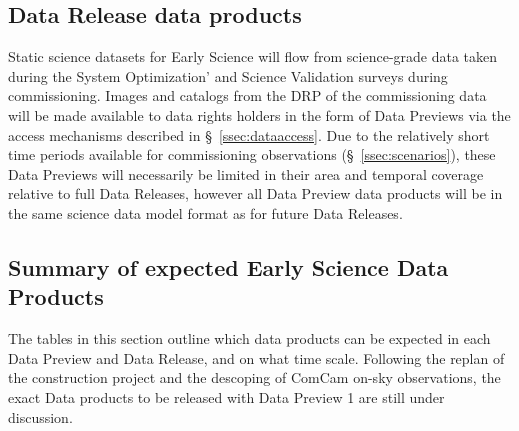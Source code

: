 %
%
%

\subsection{Data Release data products}

Static science datasets for Early Science will flow from science-grade data taken during the System Optimization' and Science Validation surveys during commissioning.
Images and catalogs from the DRP of the commissioning data will be made available to data rights holders in the form of Data Previews via the access mechanisms described in \S~\ref{ssec:dataaccess}.
Due to the relatively short time periods available for commissioning observations (\S~\ref{ssec:scenarios}), these Data Previews will necessarily be limited in their area and temporal coverage relative to full Data Releases, however all Data Preview data products will be in the same science data model format as for future Data Releases.

\subsection{Summary of expected Early Science Data Products} \label{ssec:dataproductsummary}
The tables in this section outline which data products can be expected in each Data Preview and Data Release, and on what time scale.
Following the replan of the construction project and the descoping of ComCam on-sky observations, the exact Data products to be released with Data Preview 1 are still under discussion.

